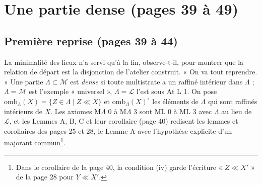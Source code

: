 \documentclass[11pt,a4paper]{article}
\begin{document}
\section*{Une partie dense (pages 39 à 49)}

\subsection*{Première reprise (pages 39 à 44)}

La minimalité des lieux n'a servi qu'à la fin, observe-t-il, pour montrer que
la relation de départ est la disjonction de l'atelier construit. « On va tout
reprendre. » Une partie $\Lambda \subset \mathcal{M}$ est \emph{dense} si toute
multistrate a un raffiné intérieur dans $\Lambda$ ; $\Lambda = \mathcal{M}$ est
l'exemple « universel », $\Lambda = \mathcal{L}$ l'est sous At L 1. On pose
$\mathrm{omb}_{\Lambda}(X) = \{Z \in \Lambda \mid Z \ll X\}$ et
$\mathrm{omb}_{\Lambda}(X)^{\circ}$ les éléments de $\Lambda$ qui sont raffinés
intérieurs de $X$. Les axiomes M$\Lambda$ 0 à M$\Lambda$ 3 sont ML 0 à ML 3 avec
$\Lambda$ au lieu de $\mathcal{L}$, et les Lemmes A, B, C et leur corollaire
(page 40) redisent les lemmes et corollaires des pages 25 et 28, le Lemme A avec
l'hypothèse explicite d'un majorant commun\footnote{Dans le corollaire de la page
40, la condition (iv) garde l'écriture « $Z \ll X'$ » de la page 28 pour $Y \ll
X'$.}.
\end{document}

